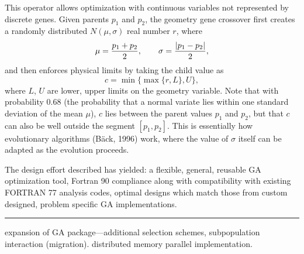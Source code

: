 
\bigskip\bigskip
This operator allows optimization with continuous variables not represented
by discrete genes.
Given parents $p_1$ and $p_2$, the geometry gene crossover first creates a
randomly distributed $N(\mu,\sigma)$ real number $r$, where
$$\mu={p_1+p_2\over2},\qquad \sigma={|p_1-p_2|\over2},  $$
and then enforces physical limits by taking the child value as
$$ c=\min\{\max \{r,L\},U\},$$
where $L$, $U$ are lower, upper limits on the geometry variable.  Note
that with probability 0.68 (the probability that a normal variate lies
within one standard deviation of the mean $\mu$), $c$ lies between the
parent values $p_1$ and $p_2$, but that $c$ can also be well outside
the segment $[p_1,p_2]$.  This is essentially how evolutionary
algorithms (B\"ack, 1996) work, where the value of $\sigma$ itself can
be adapted as the evolution proceeds.

\vfil\eject

\bigskip
The design effort described has yielded:
\bull a flexible, general, reusable GA optimization tool,
\bull Fortran 90 compliance along with compatibility
with existing FORTRAN 77 analysis codes,
\bull optimal designs which match those from custom designed,
problem specific GA implementations.
\vfil\hrule\bigskip
{}
\bigskip
\bull expansion of GA package---additional selection schemes,
subpopulation interaction (migration).
\bull distributed memory parallel implementation.

\vfil\eject\bye
